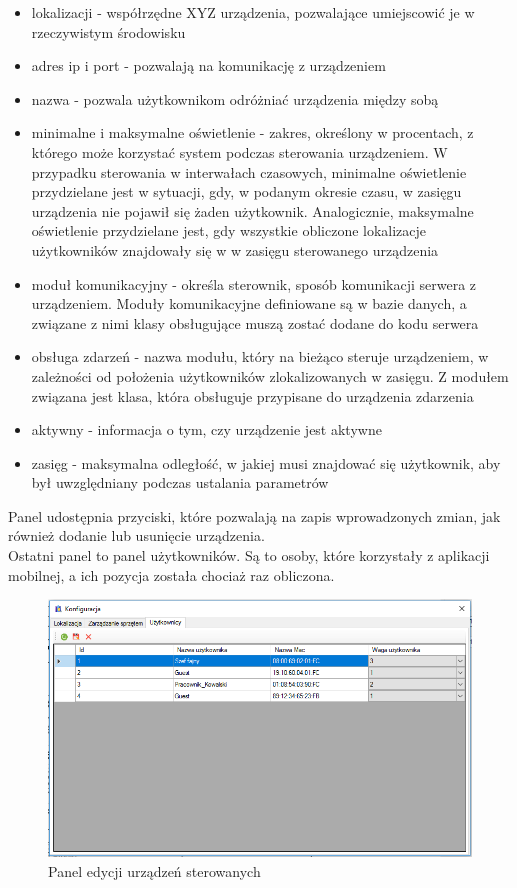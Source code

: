 \begin{itemize}
	\item lokalizacji - współrzędne XYZ urządzenia, pozwalające umiejscowić je w rzeczywistym środowisku
	\item adres ip i port - pozwalają na komunikację z urządzeniem
	\item nazwa - pozwala użytkownikom odróżniać urządzenia między sobą
	\item minimalne i maksymalne oświetlenie - zakres, określony w procentach, z którego może korzystać system podczas sterowania urządzeniem. W przypadku sterowania w interwałach czasowych, minimalne oświetlenie przydzielane jest w sytuacji, gdy, w podanym okresie czasu, w zasięgu urządzenia nie pojawił się żaden użytkownik. Analogicznie, maksymalne oświetlenie przydzielane jest, gdy wszystkie obliczone lokalizacje użytkowników znajdowały się w w zasięgu sterowanego urządzenia
	\item moduł komunikacyjny - określa sterownik, sposób komunikacji serwera z urządzeniem. Moduły komunikacyjne definiowane są w bazie danych, a związane z nimi klasy obsługujące muszą zostać dodane do kodu serwera
	\item obsługa zdarzeń - nazwa modułu, który na bieżąco steruje urządzeniem, w zależności od położenia użytkowników zlokalizowanych w zasięgu. Z modułem związana jest klasa, która obsługuje przypisane do urządzenia zdarzenia
	\item aktywny - informacja o tym, czy urządzenie jest aktywne
	\item zasięg - maksymalna odległość, w jakiej musi znajdować się użytkownik, aby był uwzględniany podczas ustalania parametrów
\end{itemize}
Panel udostępnia przyciski, które pozwalają na zapis wprowadzonych zmian, jak również dodanie lub usunięcie urządzenia.\\
Ostatni panel to panel użytkowników. Są to osoby, które korzystały z aplikacji mobilnej, a ich pozycja została chociaż raz obliczona.
\begin{figure}[H]			
	\centering
	\caption{Panel edycji urządzeń sterowanych}
	\includegraphics[width=1.0\textwidth]{panel_konf_users}
\end{figure}
